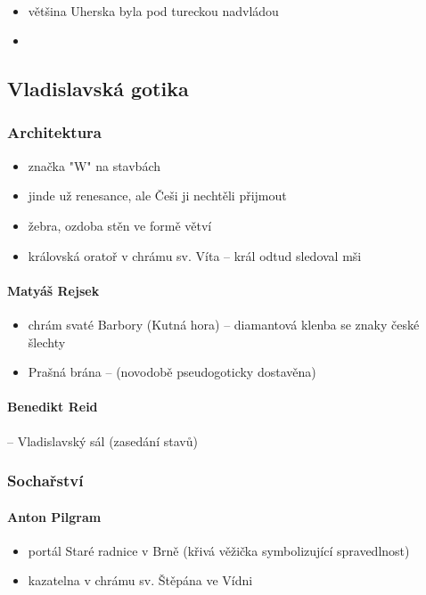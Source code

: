 \paragraph{}
\begin{itemize}
\item většina Uherska byla pod tureckou nadvládou
\item {}

\end{itemize}


\subsection{Vladislavská gotika}
\subsubsection{Architektura}
\begin{itemize}
\item značka "W" na stavbách
\item jinde už renesance, ale Češi ji nechtěli přijmout
\item žebra, ozdoba stěn ve formě větví
\item královská oratoř v chrámu sv. Víta -- král odtud sledoval mši
\end{itemize}

\paragraph{Matyáš Rejsek}
\begin{itemize}
\item chrám svaté Barbory (Kutná hora) -- diamantová klenba se znaky české šlechty 
\item Prašná brána -- (novodobě pseudogoticky dostavěna)
\end{itemize}

\paragraph{Benedikt Reid} -- Vladislavský sál (zasedání stavů)

\subsubsection{Sochařství}
\paragraph{Anton Pilgram}
\begin{itemize}
\item portál Staré radnice v Brně (křivá věžička symbolizující spravedlnost)
\item kazatelna v chrámu sv. Štěpána ve Vídni
\end{itemize}

